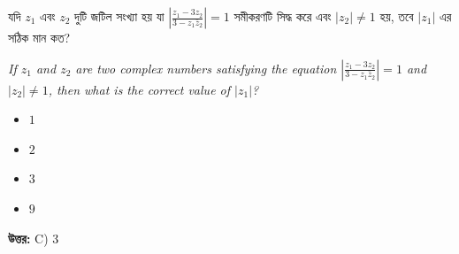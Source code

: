 \documentclass[12pt, a4paper]{article}
\begin{document}
\vspace{1em}

\begin{tcolorbox}[questionbox={প্রশ্ন (Question) 18}]
    \noindent
    যদি $z_1$ এবং $z_2$ দুটি জটিল সংখ্যা হয় যা $\left|\frac{z_1 - 3z_2}{3 - z_1 \bar{z}_2}\right| = 1$ সমীকরণটি সিদ্ধ করে এবং $|z_2| \neq 1$ হয়, তবে $|z_1|$ এর সঠিক মান কত?
    
    \vspace{0.8em}
    \begin{english}
    \noindent\textit{\color{darkgray}
    If $z_1$ and $z_2$ are two complex numbers satisfying the equation $\left|\frac{z_1 - 3z_2}{3 - z_1 \bar{z}_2}\right| = 1$ and $|z_2| \neq 1$, then what is the correct value of $|z_1|$?
    }
    \end{english}
\end{tcolorbox}

\begin{itemize}[label={}, leftmargin=1cm, itemsep=0.5em]
    \item[\textbf{A)}] $1$
    \item[\textbf{B)}] $2$
    \item[\textbf{C)}] $3$
    \item[\textbf{D)}] $9$
\end{itemize}

\vspace{0.5em}
\begin{tcolorbox}[answerbox]
    \textbf{\color{success} উত্তর:} C) $3$
\end{tcolorbox}
\vspace{1em}
\end{document}
